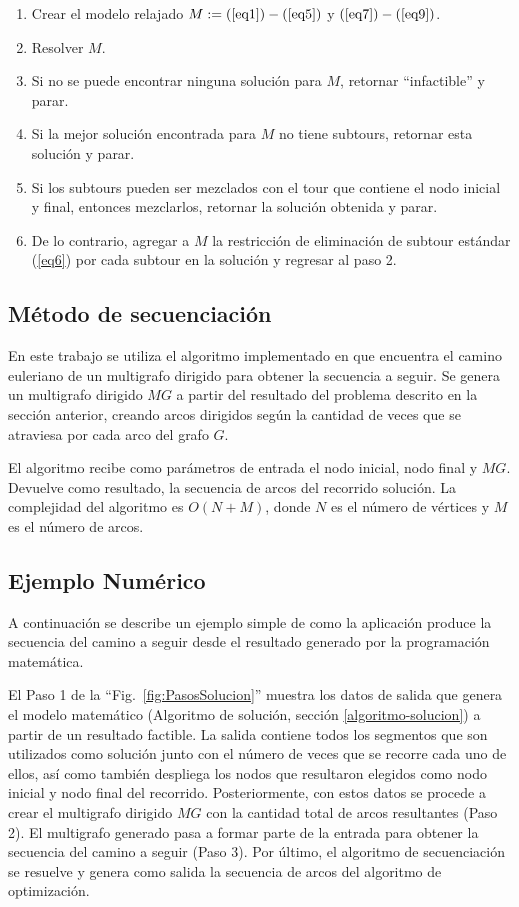 \documentclass[conference]{IEEEtran}
\begin{document}
\begin{enumerate}
\item Crear el modelo relajado $M: = (\ref{eq1}) - (\ref{eq5})$ y $(\ref{eq7}) - (\ref{eq9})$.
\item Resolver $M$.
\item Si no se puede encontrar ninguna solución para $M$, retornar ``infactible'' y parar.
\item Si la mejor solución encontrada para $M$ no tiene subtours, retornar esta solución y parar.
\item Si los subtours pueden ser mezclados con el tour que contiene el nodo inicial y final, entonces mezclarlos, retornar la solución obtenida y parar.
\item De lo contrario, agregar a $M$ la restricción de eliminación de subtour estándar (\ref{eq6}) por cada subtour en la solución y regresar al paso 2.
\end{enumerate}

\subsection{Método de secuenciación}

En este trabajo se utiliza el algoritmo implementado en \cite{RiveraHazim2015APath} que encuentra el camino euleriano de un multigrafo dirigido para obtener la secuencia a seguir. Se genera un multigrafo dirigido $MG$ a partir del resultado del problema descrito en la sección anterior, creando arcos dirigidos según la cantidad de veces que se atraviesa por cada arco del grafo $G$. 

El algoritmo recibe como parámetros de entrada el nodo inicial, nodo final y $MG$. Devuelve como resultado, la secuencia de arcos del recorrido solución. La complejidad del algoritmo es $O(N + M)$, donde $N$ es el número de vértices y $M$ es el número de arcos.

\subsection{Ejemplo Numérico}
A continuación se describe un ejemplo simple de como la aplicación produce la secuencia del camino a seguir desde el resultado generado por la programación matemática.

El Paso 1 de la ``Fig.~\ref{fig:PasosSolucion}'' muestra los datos de salida que genera el modelo matemático (Algoritmo  de  solución, sección \ref{algoritmo-solucion}) a partir de un resultado factible. La salida contiene todos los segmentos que son utilizados como solución junto con el número de veces que se recorre cada uno de ellos, así como también despliega los nodos que resultaron elegidos como nodo inicial y nodo final del recorrido. Posteriormente, con estos datos se procede a crear el multigrafo dirigido $MG$ con la cantidad total de arcos resultantes (Paso 2). El multigrafo generado pasa a formar parte de la entrada para obtener la secuencia del camino a seguir (Paso 3). Por último, el algoritmo de secuenciación se resuelve y genera como salida la secuencia de arcos del algoritmo de optimización.
\end{document}
